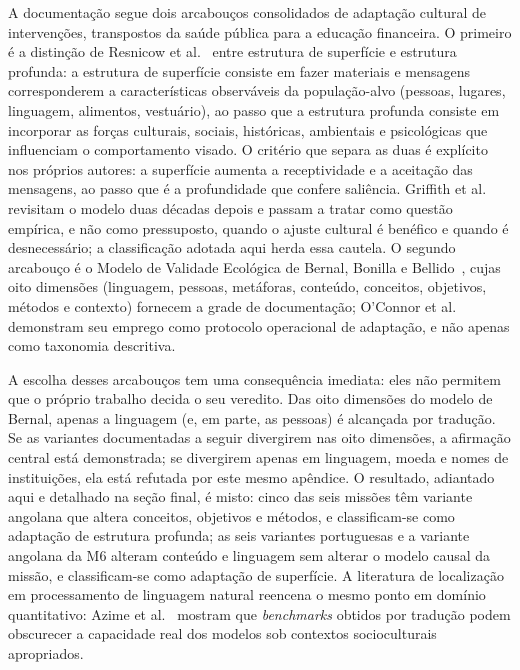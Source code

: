 A documentação segue dois arcabouços consolidados de adaptação cultural de intervenções, transpostos da saúde pública para a educação financeira. O primeiro é a distinção de Resnicow et al.~\cite{resnicow1999} entre estrutura de superfície e estrutura profunda: a estrutura de superfície consiste em fazer materiais e mensagens corresponderem a características observáveis da população-alvo (pessoas, lugares, linguagem, alimentos, vestuário), ao passo que a estrutura profunda consiste em incorporar as forças culturais, sociais, históricas, ambientais e psicológicas que influenciam o comportamento visado. O critério que separa as duas é explícito nos próprios autores: a superfície aumenta a receptividade e a aceitação das mensagens, ao passo que é a profundidade que confere saliência. Griffith et al.~\cite{griffith2023} revisitam o modelo duas décadas depois e passam a tratar como questão empírica, e não como pressuposto, quando o ajuste cultural é benéfico e quando é desnecessário; a classificação adotada aqui herda essa cautela. O segundo arcabouço é o Modelo de Validade Ecológica de Bernal, Bonilla e Bellido~\cite{bernal1995}, cujas oito dimensões (linguagem, pessoas, metáforas, conteúdo, conceitos, objetivos, métodos e contexto) fornecem a grade de documentação; O'Connor et al.~\cite{oconnor2020} demonstram seu emprego como protocolo operacional de adaptação, e não apenas como taxonomia descritiva.

A escolha desses arcabouços tem uma consequência imediata: eles não permitem que o próprio trabalho decida o seu veredito. Das oito dimensões do modelo de Bernal, apenas a linguagem (e, em parte, as pessoas) é alcançada por tradução. Se as variantes documentadas a seguir divergirem nas oito dimensões, a afirmação central está demonstrada; se divergirem apenas em linguagem, moeda e nomes de instituições, ela está refutada por este mesmo apêndice. O resultado, adiantado aqui e detalhado na seção final, é misto: cinco das seis missões têm variante angolana que altera conceitos, objetivos e métodos, e classificam-se como adaptação de estrutura profunda; as seis variantes portuguesas e a variante angolana da M6 alteram conteúdo e linguagem sem alterar o modelo causal da missão, e classificam-se como adaptação de superfície. A literatura de localização em processamento de linguagem natural reencena o mesmo ponto em domínio quantitativo: Azime et al.~\cite{azime2025} mostram que \textit{benchmarks} obtidos por tradução podem obscurecer a capacidade real dos modelos sob contextos socioculturais apropriados.


